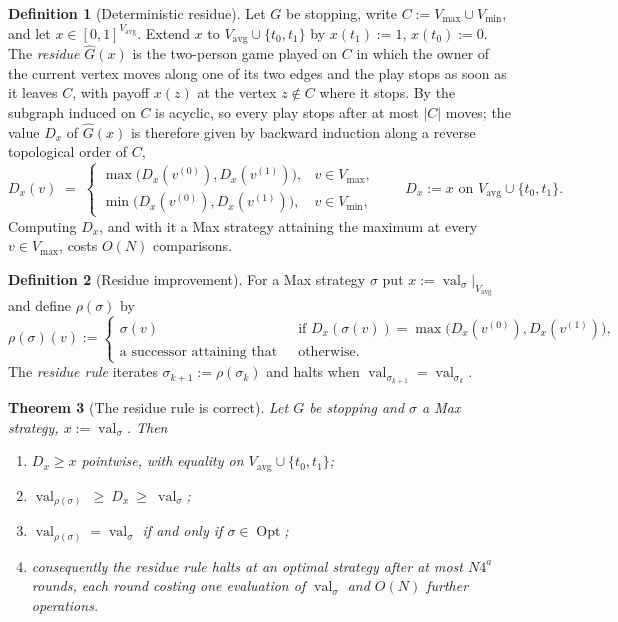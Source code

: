 \documentclass[11pt]{article}
\theoremstyle{plain}
\newtheorem{theorem}{Theorem}[section]
\theoremstyle{definition}
\newtheorem{definition}[theorem]{Definition}
\DeclareMathOperator{\val}{val}
\DeclareMathOperator{\Opt}{Opt}
\newcommand{\Vmax}{V_{\max}}
\newcommand{\Vmin}{V_{\min}}
\newcommand{\Vavg}{V_{\mathrm{avg}}}
\begin{document}
\begin{definition}[Deterministic residue]\label{def:residue}
Let $G$ be stopping, write $C:=\Vmax\cup\Vmin$, and let
$x\in[0,1]^{\Vavg}$. Extend $x$ to $\Vavg\cup\{t_0,t_1\}$ by $x(t_1):=1$,
$x(t_0):=0$. The \emph{residue} $\widehat G(x)$ is the two-person game
played on $C$ in which the owner of the current vertex moves along one of
its two edges and the play stops as soon as it leaves $C$, with payoff
$x(z)$ at the vertex $z\notin C$ where it stops. By 
the subgraph induced on $C$ is acyclic, so every play stops after at most
$|C|$ moves; the value $D_x$ of $\widehat G(x)$ is therefore given by
backward induction along a reverse topological order of $C$,
\[
  D_x(v)\;=\;
  \begin{cases}
    \max\bigl(D_x(v^{(0)}),D_x(v^{(1)})\bigr), & v\in\Vmax,\\[2pt]
    \min\bigl(D_x(v^{(0)}),D_x(v^{(1)})\bigr), & v\in\Vmin,
  \end{cases}
  \qquad D_x:=x \text{ on } \Vavg\cup\{t_0,t_1\}.
\]
Computing $D_x$, and with it a Max strategy attaining the maximum at
every $v\in\Vmax$, costs $O(N)$ comparisons.
\end{definition}

\begin{definition}[Residue improvement]\label{def:residue-rule}
For a Max strategy $\sigma$ put $x:=\val_\sigma|_{\Vavg}$ and define
$\rho(\sigma)$ by
\[
  \rho(\sigma)(v):=
  \begin{cases}
    \sigma(v) & \text{if } D_x(\sigma(v))=\max\bigl(D_x(v^{(0)}),D_x(v^{(1)})\bigr),\\
    \text{a successor attaining that maximum} & \text{otherwise.}
  \end{cases}
\]
The \emph{residue rule} iterates $\sigma_{k+1}:=\rho(\sigma_k)$ and halts
when $\val_{\sigma_{k+1}}=\val_{\sigma_k}$.
\end{definition}

\begin{theorem}[The residue rule is correct]\label{thm:residue-correct}
Let $G$ be stopping and $\sigma$ a Max strategy, $x:=\val_\sigma$. Then
\begin{enumerate}[label=(\alph*),leftmargin=2.2em]
\item $D_x\ge x$ pointwise, with equality on $\Vavg\cup\{t_0,t_1\}$;
\item $\val_{\rho(\sigma)}\ \ge\ D_x\ \ge\ \val_\sigma$;
\item $\val_{\rho(\sigma)}=\val_\sigma$ if and only if $\sigma\in\Opt$;
\item consequently the residue rule halts at an optimal strategy after at
      most $N4^{a}$ rounds, each round costing one evaluation of
      $\val_\sigma$ and $O(N)$ further operations.
\end{enumerate}
\end{theorem}
\end{document}
